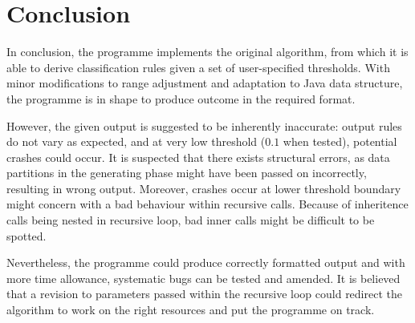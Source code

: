 \chapter{Conclusion}

In conclusion, the programme implements the original algorithm, from which it is able to derive classification rules given a set of user-specified thresholds. With minor modifications to range adjustment and adaptation to Java data structure, the programme is in shape to produce outcome in the required format.

However, the given output is suggested to be inherently inaccurate: output rules do not vary as expected, and at very low threshold ($0.1$ when tested), potential crashes could occur. It is suspected that there exists structural errors, as data partitions in the generating phase might have been passed on incorrectly, resulting in wrong output. Moreover, crashes occur at lower threshold boundary might concern with a bad behaviour within recursive calls. Because of inheritence calls being nested in recursive loop, bad inner calls might be difficult to be spotted.

Nevertheless, the programme could produce correctly formatted output and with more time allowance, systematic bugs can be tested and amended. It is believed that a revision to parameters passed within the recursive loop could redirect the algorithm to work on the right resources and put the programme on track. 